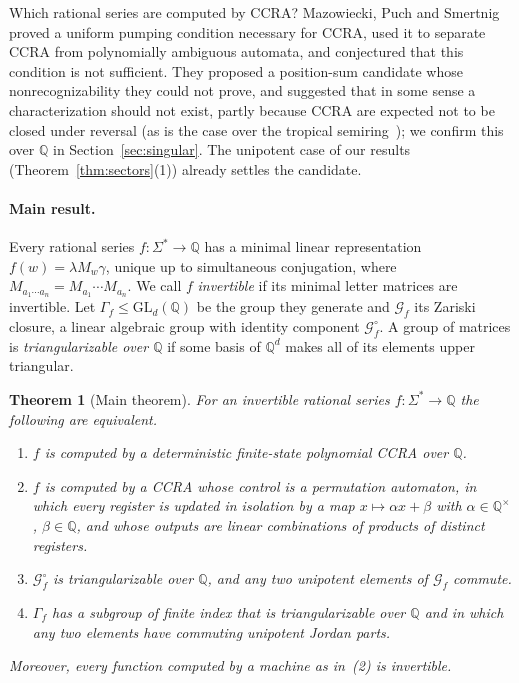 \documentclass[acmlarge,screen,11pt,nonacm,natbib=false]{acmart}
\newcommand{\Q}{\mathbb{Q}}
\newcommand{\cG}{\mathcal{G}}
\newcommand{\GL}{\mathrm{GL}}
\newtheorem{theorem}{Theorem}
\theoremstyle{definition}
\begin{document}
Which rational series are computed by CCRA? Mazowiecki, Puch and Smertnig~\cite{MPS26} proved a uniform pumping condition necessary for CCRA, used it to separate CCRA from polynomially ambiguous automata, and conjectured that this condition is not sufficient. They proposed a position-sum candidate whose nonrecognizability they could not prove, and suggested that in some sense a characterization should not exist, partly because CCRA are expected not to be closed under reversal (as is the case over the tropical semiring~\cite{MR16}); we confirm this over $\Q$ in Section~\ref{sec:singular}. The unipotent case of our results (Theorem~\ref{thm:sectors}(1)) already settles the candidate.

\paragraph{Main result.}
Every rational series $f:\Sigma^*\to\Q$ has a minimal linear representation $f(w)=\lambda M_w\gamma$, unique up to simultaneous conjugation, where $M_{a_1\cdots a_n}=M_{a_1}\cdots M_{a_n}$. We call $f$ \emph{invertible} if its minimal letter matrices are invertible. Let $\Gamma_f\le\GL_d(\Q)$ be the group they generate and $\cG_f$ its Zariski closure, a linear algebraic group with identity component $\cG_f^\circ$. A group of matrices is \emph{triangularizable over $\Q$} if some basis of $\Q^d$ makes all of its elements upper triangular.

\begin{theorem}[Main theorem]\label{thm:main}
For an invertible rational series $f:\Sigma^*\to\Q$ the following are equivalent.
\begin{enumerate}
\item $f$ is computed by a deterministic finite-state polynomial CCRA over $\Q$.
\item $f$ is computed by a CCRA whose control is a permutation automaton, in which every register is updated in isolation by a map $x\mapsto\alpha x+\beta$ with $\alpha\in\Q^\times$, $\beta\in\Q$, and whose outputs are linear combinations of products of distinct registers.
\item $\cG_f^\circ$ is triangularizable over $\Q$, and any two unipotent elements of $\cG_f$ commute.
\item $\Gamma_f$ has a subgroup of finite index that is triangularizable over $\Q$ and in which any two elements have commuting unipotent Jordan parts.
\end{enumerate}
Moreover, every function computed by a machine as in~(2) is invertible.
\end{theorem}
\end{document}
